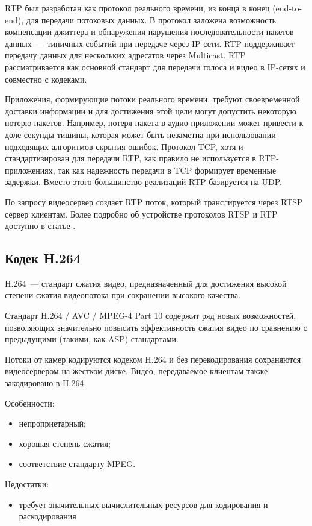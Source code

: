 RTP был разработан как протокол реального времени, из конца в конец (end-to-end), для передачи
потоковых данных. В протокол заложена возможность компенсации джиттера и обнаружения нарушения
последовательности пакетов данных~--- типичных событий при передаче через IP-сети. RTP поддерживает
передачу данных для нескольких адресатов через Multicast. RTP рассматривается как основной стандарт
для передачи голоса и видео в IP-сетях и совместно с кодеками.

Приложения, формирующие потоки реального времени, требуют своевременной доставки информации и для
достижения этой цели могут допустить некоторую потерю пакетов. Например, потеря пакета в
аудио-приложении может привести к доле секунды тишины, которая может быть незаметна при
использовании подходящих алгоритмов скрытия ошибок. Протокол TCP, хотя и стандартизирован для
передачи RTP, как правило не используется в RTP-приложениях, так как надежность передачи в TCP
формирует временные задержки. Вместо этого большинство реализаций RTP базируется на UDP.

По запросу видеосервер создает RTP поток, который транслируется через RTSP сервер клиентам.
Более подробно об устройстве протоколов RTSP и RTP доступно в статье \cite{rtsp_about}.

\subsection{Кодек H.264}
H.264~--- стандарт сжатия видео, предназначенный для достижения высокой степени сжатия видеопотока
при сохранении высокого качества.

Стандарт H.264 / AVC / MPEG-4 Part 10 содержит ряд новых возможностей, позволяющих значительно
повысить эффективность сжатия видео по сравнению с предыдущими (такими, как ASP) стандартами.

Потоки от камер кодируются кодеком H.264 и без перекодирования сохраняются видеосервером на
жестком диске. Видео, передаваемое клиентам также закодировано в H.264.

\medskip

Особенности:
\smallskip
\begin{itemize}
	\item непроприетарный;
	\item хорошая степень сжатия;
	\item соответствие стандарту MPEG.
\end{itemize}

\medskip

Недостатки:
\smallskip
\begin{itemize}
	\item требует значительных вычислительных ресурсов для кодирования и раскодирования
\end{itemize}

